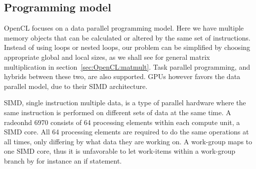 \subsection{Programming model}
OpenCL focuses on a data parallel programming model.
Here we have multiple memory objects that can be calculated or altered by the same set of instructions. 
Instead of using loops or nested loops, our problem can be simplified by choosing appropriate global and local sizes, as we shall see for general matrix multiplication in section~\ref{sec:OpenCL:matmult}.
Task parallel programming, and hybrids between these two, are also supported. 
GPUs however favors the data parallel model, due to their SIMD architecture.

SIMD, single instruction multiple data, is a type of parallel hardware where the same instruction is performed on different sets of data at the same time.
A radeonhd 6970 consists of 64 processing elements within each compute unit, a SIMD core.
All 64 processing elements are required to do the same operations at all times, only differing by what data they are working on.
A work-group maps to one SIMD core, thus it is unfavorable to let work-items within a work-group branch by for instance an if statement.






